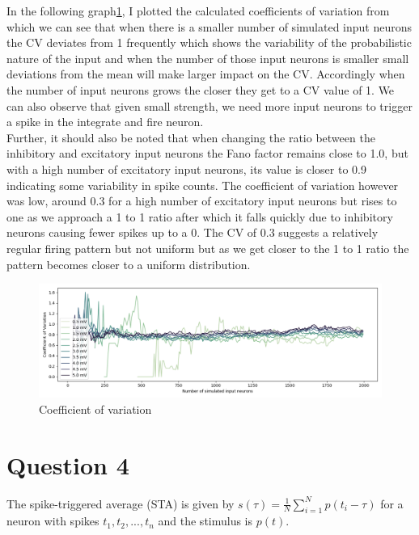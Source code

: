 \documentclass[11pt]{article}
\begin{document}
In the following graph\ref{fig:q3_graph4}, I plotted the calculated coefficients of variation from which we can see that when there is a smaller number of simulated input neurons the CV deviates from 1 frequently which shows the variability of the probabilistic nature of the input and when the number of those input neurons is smaller small deviations from the mean will make larger impact on the CV. Accordingly when the number of input neurons grows the closer they get to a CV value of 1. We can also observe that given small strength, we need more input neurons to trigger a spike in the integrate and fire neuron.\\
Further, it should also be noted that when changing the ratio between the inhibitory and excitatory input neurons the Fano factor remains close to 1.0, but with a high number of excitatory input neurons, its value is closer to 0.9 indicating some variability in spike counts. The coefficient of variation however was low, around 0.3 for a high number of excitatory input neurons but rises to one as we approach a 1 to 1 ratio after which it falls quickly due to inhibitory neurons causing fewer spikes up to a 0. The CV of 0.3 suggests a relatively regular firing pattern but not uniform but as we get closer to the 1 to 1 ratio the pattern becomes closer to a uniform distribution.

\begin{figure}[ht]
    \centering
    \includegraphics[width=1.0\linewidth]{Figure_CV.png}
    \captionsetup{font=small}
    \caption{Coefficient of variation}
    \label{fig:q3_graph4}
\end{figure}

\section*{Question 4} \label{question 4}
The spike-triggered average (STA) is given by $s(\tau) = \frac{1}{N} \sum_{i=1}^{N} p(t_i - \tau)$ for a neuron with spikes ${t_1,t_2,...,t_n}$ and the stimulus is $p(t)$.
\end{document}
